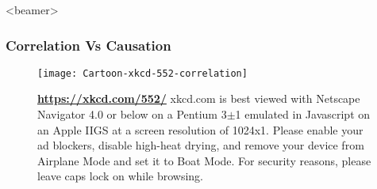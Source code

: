 

\begin{frame}<beamer>
\frametitle{Correlation Vs Causation}
\begin{figure}
\centering
\texttt{[image: Cartoon-xkcd-552-correlation]}
\caption{\textbf{\url{https://xkcd.com/552/}}
\newline xkcd.com is best viewed with Netscape Navigator 4.0 or below on a Pentium 3$\pm$1 emulated in Javascript on an Apple IIGS at a screen resolution of 1024x1. Please enable your ad blockers, disable high-heat drying, and remove your device from Airplane Mode and set it to Boat Mode. For security reasons, please leave caps lock on while browsing.}
\end{figure}
\end{frame}


